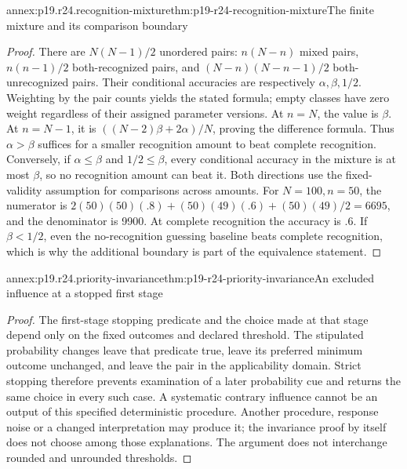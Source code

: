 \begin{annexitem}{annex:p19.r24.recognition-mixture}{thm:p19-r24-recognition-mixture}{The finite mixture and its comparison boundary}
\begin{proof}
There are \(N(N-1)/2\) unordered pairs: \(n(N-n)\)
mixed pairs, \(n(n-1)/2\) both-recognized pairs, and
\((N-n)(N-n-1)/2\) both-unrecognized pairs. Their conditional
accuracies are respectively \(\alpha,\beta,1/2\). Weighting
by the pair counts yields the stated formula; empty classes
have zero weight regardless of their assigned parameter versions.
At \(n=N\), the value is \(\beta\). At \(n=N-1\),
it is \(((N-2)\beta+2\alpha)/N\), proving the difference
formula. Thus \(\alpha>\beta\) suffices for a smaller
recognition amount to beat complete recognition. Conversely,
if \(\alpha\leq\beta\) and \(1/2\leq\beta\), every
conditional accuracy in the mixture is at most \(\beta\),
so no recognition amount can beat it. Both directions use
the fixed-validity assumption for comparisons across amounts.
For \(N=100,n=50\), the numerator is
\(2(50)(50)(.8)+(50)(49)(.6)+(50)(49)/2=6695\),
and the denominator is 9900. At complete recognition the
accuracy is .6. If \(\beta<1/2\), even the no-recognition
guessing baseline beats complete recognition, which is why
the additional boundary is part of the equivalence statement.
\end{proof}
\end{annexitem}

\begin{annexitem}{annex:p19.r24.priority-invariance}{thm:p19-r24-priority-invariance}{An excluded influence at a stopped first stage}
\begin{proof}
The first-stage stopping predicate and the choice made at that
stage depend only on the fixed outcomes and declared threshold.
The stipulated probability changes leave that predicate true,
leave its preferred minimum outcome unchanged, and leave the
pair in the applicability domain. Strict stopping therefore
prevents examination of a later probability cue and returns
the same choice in every such case. A systematic contrary
influence cannot be an output of this specified deterministic
procedure. Another procedure, response noise or a changed
interpretation may produce it; the invariance proof by itself
does not choose among those explanations. The argument
does not interchange rounded and unrounded thresholds.
\end{proof}
\end{annexitem}

